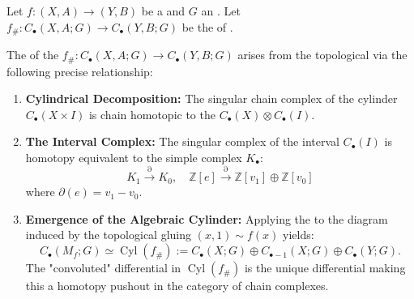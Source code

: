 \begin{theorem} \label{theorem:precise_correspondence_between_topological_cylinder_of_pairs_of_spaces_and_algebraic_cylinders_of_singular_chain_complexes}
    \TODO{}
Let $f: (X, A) \to (Y, B)$ be a  and $G$ an . Let $f_\#: C_\bullet(X,A;G) \to C_\bullet(Y,B;G)$ be the  of .

The  of the $f_\#: C_\bullet(X,A;G) \to C_\bullet(Y,B;G)$ arises from the topological  via the following precise relationship:

\begin{enumerate}
    \item \textbf{Cylindrical Decomposition:} The singular chain complex of the cylinder $C_\bullet(X \times I)$ is chain homotopic to the  $C_\bullet(X) \otimes C_\bullet(I)$. 
    
    \item \textbf{The Interval Complex:} The singular complex of the interval $C_\bullet(I)$ is homotopy equivalent to the simple complex $K_\bullet$:
    $$ K_1 \xrightarrow{\partial} K_0, \quad \mathbb{Z}[e] \xrightarrow{\partial} \mathbb{Z}[v_1] \oplus \mathbb{Z}[v_0] $$
    where $\partial(e) = v_1 - v_0$.
    
    \item \textbf{Emergence of the Algebraic Cylinder:} Applying the  to the diagram induced by the topological gluing $(x, 1) \sim f(x)$ yields:
    $$ C_\bullet(M_f; G) \simeq \operatorname{Cyl}(f_\#) := C_\bullet(X; G) \oplus C_{\bullet-1}(X; G) \oplus C_\bullet(Y; G). $$
    The "convoluted" differential in $\operatorname{Cyl}(f_\#)$ is the unique differential making this a homotopy pushout in the category of chain complexes.
\end{enumerate}
\end{theorem}
